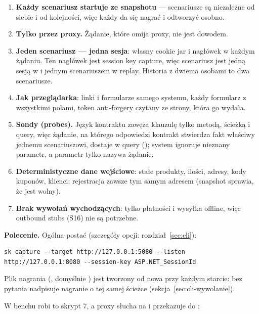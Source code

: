 \begin{enumerate}
  \item \textbf{Każdy scenariusz startuje ze snapshotu} --- scenariusze są niezależne od
        siebie i od kolejności, więc każdy da się nagrać i odtworzyć osobno.
  \item \textbf{Tylko przez proxy.} Żądanie, które omija proxy, nie jest dowodem.
  \item \textbf{Jeden scenariusz --- jedna sesja}: własny cookie jar i nagłówek
         w każdym żądaniu. Ten nagłówek jest session
        key capture, więc scenariusz jest jedną sesją w  i jednym
        scenariuszem w replay. Historia z dwiema osobami to dwa scenariusze.
  \item \textbf{Jak przeglądarka}: linki i formularze samego systemu, każdy formularz z
        wszystkimi polami, token anti-forgery czytany ze strony, która go wydała.
  \item \textbf{Sondy (probes).} Język kontraktu zawęża klauzulę tylko metodą, ścieżką i
        query, więc żądanie, na którego odpowiedzi kontrakt stwierdza fakt właściwy
        jednemu scenariuszowi, dostaje w query 
        (); system ignoruje nieznany parametr, a parametr tylko
        nazywa żądanie.
  \item \textbf{Deterministyczne dane wejściowe}: stałe produkty, ilości, adresy, kody
        kuponów, klienci; rejestracja zawsze tym samym adresem (snapshot sprawia, że jest
        wolny).
  \item \textbf{Brak wywołań wychodzących}: tylko płatności i wysyłka offline, więc
        outbound stubs (S16) nie są potrzebne.
\end{enumerate}

\textbf{Polecenie.} Ogólna postać (szczegóły opcji: rozdział~\ref{sec:cli}):

\begin{lstlisting}
sk capture --target http://127.0.0.1:5080 --listen http://127.0.0.1:8080 --session-key ASP.NET_SessionId
\end{lstlisting}

Plik nagrania (, domyślnie ) jest tworzony od
nowa przy każdym starcie:  bez pytania nadpisuje nagranie o tej samej
ścieżce (sekcja~\ref{sec:cli-wywolanie}).

W benchu robi to skrypt 7, a proxy słucha na  i przekazuje
do :

